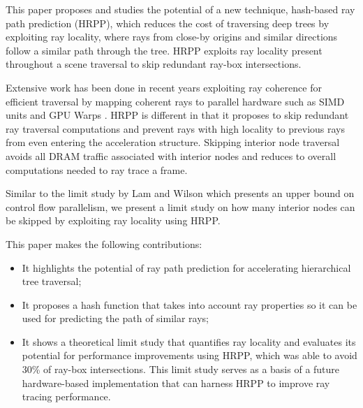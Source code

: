 This paper proposes and studies the potential of a new technique, hash-based ray path prediction (HRPP), which reduces the cost of traversing deep trees by exploiting ray locality, where rays from close-by origins and similar directions follow a similar path through the tree. HRPP exploits ray locality present throughout a scene traversal to skip redundant ray-box intersections. 

Extensive work has been done in recent years exploiting ray coherence for efficient traversal by mapping coherent rays to parallel hardware such as SIMD units and GPU Warps \cite{doi:10.1111/1467-8659.00508, Wald07simdray, Pharr:1997:RCS:258734.258791}. HRPP is different in that it proposes to skip redundant ray traversal computations and prevent rays with high locality to previous rays from even entering the acceleration structure. Skipping interior node traversal avoids all DRAM traffic associated with interior nodes and reduces to overall computations needed to ray trace a frame.

Similar to the limit study by Lam and Wilson \cite{Lam:1992:LCF:139669.139702} which presents an upper bound on control flow parallelism, we present a limit study on how many interior nodes can be skipped by exploiting ray locality using HRPP.

This paper makes the following contributions:
\begin{itemize}
\item It highlights the potential of ray path prediction for accelerating hierarchical tree traversal;
\item It proposes a hash function that takes into account ray properties so it can be used for predicting the path of similar rays;
\item It shows a theoretical limit study that quantifies ray locality and evaluates its potential for performance improvements using HRPP, which was able to avoid 30\% of ray-box intersections. This limit study serves as a basis of a future hardware-based implementation that can harness HRPP to improve ray tracing performance.
\end{itemize}